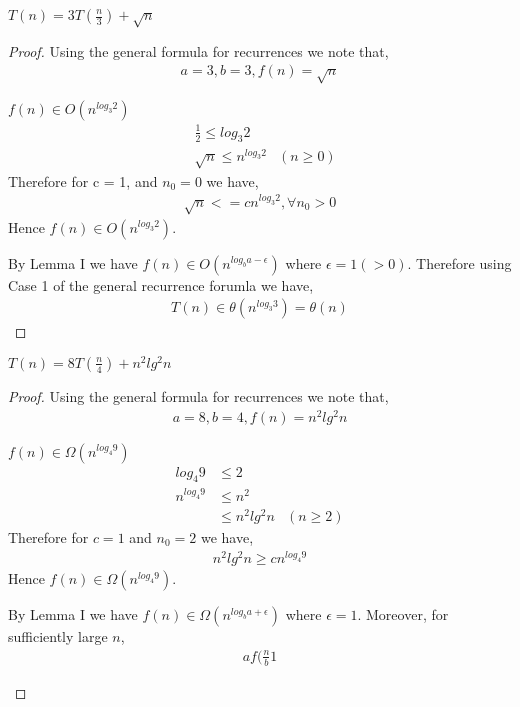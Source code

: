 \documentclass[12pt]{article}
\newenvironment{lemma}[2][Lemma]{\begin{trivlist}
\item[\hskip \labelsep {\bfseries #1}\hskip \labelsep {\bfseries #2.}]}{\end{trivlist}}
\newenvironment{question}[2][Question]{\begin{trivlist}
\item[\hskip \labelsep {\bfseries #1}\hskip \labelsep {\bfseries #2.}]}{\end{trivlist}}
\begin{document}
\begin{question}{5 (b)} $T(n) = 3T(\frac{n}{3}) + \sqrt{n}$
  \leavevmode \\
  \begin{proof}
    Using the general formula for recurrences we note that,
    \begin{align*}
      a = 3, b = 3, f(n) = \sqrt{n}
    \end{align*}

    \begin{lemma}{1} $f(n) \in O(n^{log_{3}2})$
      \begin{align*}
        &\frac{1}{2} \leq log_{3}2  &\\
        &\sqrt{n} \leq n^{log_{3}2} & (n \geq 0)
      \end{align*}
      Therefore for c = 1, and $n_{0} = 0$ we have,
      \begin{align*}
        \sqrt{n} <= cn^{log_{3}2}, \forall n_{0} > 0
      \end{align*}
      Hence $f(n) \in O(n^{log_{3}2})$.
    \end{lemma}

    By Lemma I we have $f(n) \in O(n^{log_{b}a - \epsilon})$ where $\epsilon = 1 (>0)$.
    Therefore using Case 1 of the general recurrence forumla we have,
    \begin{align*}
      T(n) \in \theta(n^{log_{3}3}) = \theta(n)
    \end{align*}
  \end{proof}
\end{question}

\begin{question}{5 (c)} $T(n) = 8T(\frac{n}{4}) + n^{2}lg^{2}n$
  \begin{proof}
    Using the general formula for recurrences we note that,
    \begin{align*}
      a = 8, b = 4, f(n) = n^{2}lg^{2}n
    \end{align*}

    \begin{lemma}{I} $f(n) \in \Omega(n^{log_{4}9})$
      \begin{align*}
        log_{4}9     & \leq 2&\\
        n^{log_{4}9} & \leq n^{2} &\\
                     & \leq n^{2}lg^{2}n & (n \geq 2)
      \end{align*}
      Therefore for $c = 1$ and $n_{0} = 2$ we have,
      \begin{align*}
        n^{2}lg^{2}n \geq cn^{log_{4}9}
      \end{align*}
      Hence $f(n) \in \Omega(n^{log_{4}9})$.

      By Lemma I we have $f(n) \in \Omega(n^{log_{b}a + \epsilon})$ where $\epsilon = 1$.
      Moreover, for sufficiently large $n$,
      \begin{align*}
        af(\frac{n}{b} 1
      \end{align*}
    \end{lemma}
  \end{proof}
\end{question}
\end{document}
